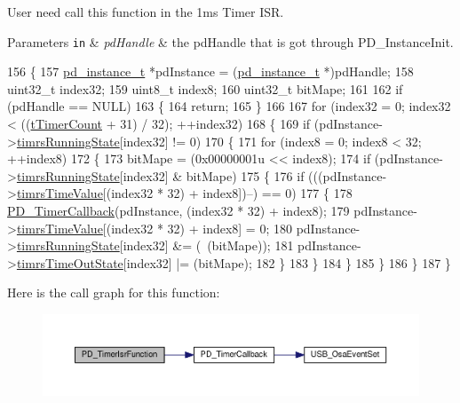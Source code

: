 User need call this function in the 1ms Timer I\-S\-R.


\begin{DoxyParams}[1]{Parameters}
\mbox{\tt in}  & {\em pd\-Handle} & the pd\-Handle that is got through P\-D\-\_\-\-Instance\-Init. \\
\hline
\end{DoxyParams}

\begin{DoxyCode}
156 \{
157     \hyperlink{struct__pd__instance}{pd\_instance\_t} *pdInstance = (\hyperlink{struct__pd__instance}{pd\_instance\_t} *)pdHandle;
158     uint32\_t index32;
159     uint8\_t index8;
160     uint32\_t bitMape;
161 
162     \textcolor{keywordflow}{if} (pdHandle == NULL)
163     \{
164         \textcolor{keywordflow}{return};
165     \}
166 
167     \textcolor{keywordflow}{for} (index32 = 0; index32 < ((\hyperlink{usb__pd__timer_8h_a94e23fe7d4bf2bf6f8de1f51126d071fa208e3a31f39a2eafdaa34d97ae09cd6f}{tTimerCount} + 31) / 32); ++index32)
168     \{
169         \textcolor{keywordflow}{if} (pdInstance->\hyperlink{struct__pd__instance_a00d9a2aa7fd533c3ac15236b61e894f0}{timrsRunningState}[index32] != 0)
170         \{
171             \textcolor{keywordflow}{for} (index8 = 0; index8 < 32; ++index8)
172             \{
173                 bitMape = (0x00000001u << index8);
174                 \textcolor{keywordflow}{if} (pdInstance->\hyperlink{struct__pd__instance_a00d9a2aa7fd533c3ac15236b61e894f0}{timrsRunningState}[index32] & bitMape)
175                 \{
176                     \textcolor{keywordflow}{if} (((pdInstance->\hyperlink{struct__pd__instance_a10267d00b21df313fb3064255d161d6b}{timrsTimeValue}[(index32 * 32) + index8])--) == 0)
177                     \{
178                         \hyperlink{usb__pd__timer_8c_a2db2b7ebded2d6a9e062a6cc7bfce4d7}{PD\_TimerCallback}(pdInstance, (index32 * 32) + index8);
179                         pdInstance->\hyperlink{struct__pd__instance_a10267d00b21df313fb3064255d161d6b}{timrsTimeValue}[(index32 * 32) + index8] = 0;
180                         pdInstance->\hyperlink{struct__pd__instance_a00d9a2aa7fd533c3ac15236b61e894f0}{timrsRunningState}[index32] &= (~(bitMape));
181                         pdInstance->\hyperlink{struct__pd__instance_a4e19ba81575c13f30d4482d5ac141573}{timrsTimeOutState}[index32] |= (bitMape);
182                     \}
183                 \}
184             \}
185         \}
186     \}
187 \}
\end{DoxyCode}


Here is the call graph for this function\-:
\nopagebreak
\begin{figure}[H]
\begin{center}
\leavevmode
\includegraphics[width=350pt]{group__usb__pd__stack_gad8420ee79286dfb87b1b9d9c0845f31d_cgraph}
\end{center}
\end{figure}




